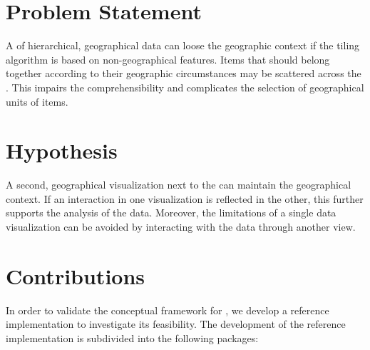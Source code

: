 \section{Problem Statement}
%

A \tmap{} of hierarchical, geographical data can loose the geographic context if the tiling algorithm is based on non-geographical features.
Items that should belong together according to their geographic circumstances may be scattered across the \tmap{}.
This impairs the comprehensibility and complicates the selection of geographical units of items.

\section{Hypothesis}

A second, geographical visualization next to the \tmap{} can maintain the geographical context.
If an interaction in one visualization is reflected in the other, this further supports the analysis of the data.
Moreover, the limitations of a single data visualization can be avoided by interacting with the data through another view.


\section{Contributions}

In order to validate the conceptual framework for \cmvs{}, we develop a reference implementation to investigate its feasibility.
The development of the reference implementation is subdivided into the following packages:

